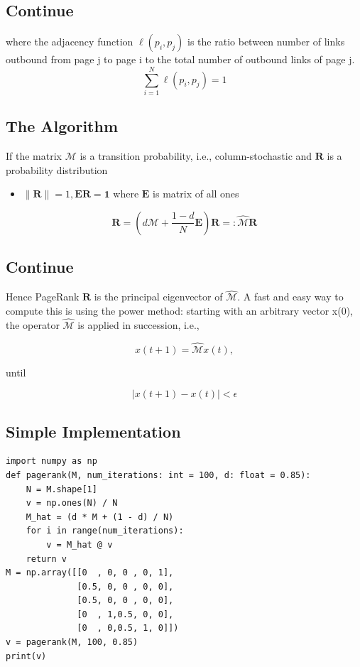 \documentclass[11pt]{article}
\begin{document}
\subsection*{Continue}
\label{sec:orgd5ecc5b}
where the adjacency function \(\ell( p_i , p_j )\) is the ratio between number of links outbound from page j to page i to the total number of outbound links of page j.
\begin{equation} \sum_{i = 1}^N \ell(p_i,p_j) = 1 \end{equation}



\subsection*{The Algorithm}
\label{sec:orgafef686}
If the matrix \({\mathcal {M}}\) is a transition probability, i.e., column-stochastic and \(\mathbf{R}\) is a probability distribution
\begin{itemize}
\item \(\|\mathbf{R}\|=1, \mathbf{E}\mathbf{R}=\mathbf{1}\) where \(\mathbf{E}\) is matrix of all ones
\end{itemize}

\[ \mathbf{R} = \left( d \mathcal{M} + \frac{1-d}{N} \mathbf{E} \right)\mathbf{R} =: \widehat{ \mathcal{M}} \mathbf{R} \]

\subsection*{Continue}
\label{sec:orge8d415a}
Hence PageRank  \(\mathbf{R}\) is the principal eigenvector of \(\widehat{\mathcal{M}}\). A fast and easy way to compute this is using the power method: starting with an arbitrary vector  x(0), the operator \(\widehat{\mathcal{M}}\) is applied in succession, i.e.,

\[ x(t+1) = \widehat{\mathcal{M}} x(t), \]

until

\[ |x(t+1) - x(t)| <  \epsilon \]



\subsection*{Simple Implementation}
\label{sec:orgf34781d}
\begin{verbatim}
import numpy as np
def pagerank(M, num_iterations: int = 100, d: float = 0.85):
    N = M.shape[1]
    v = np.ones(N) / N
    M_hat = (d * M + (1 - d) / N)
    for i in range(num_iterations):
        v = M_hat @ v
    return v
M = np.array([[0  , 0, 0 , 0, 1],
              [0.5, 0, 0 , 0, 0],
              [0.5, 0, 0 , 0, 0],
              [0  , 1,0.5, 0, 0],
              [0  , 0,0.5, 1, 0]])
v = pagerank(M, 100, 0.85)
print(v)
\end{verbatim}
\end{document}
